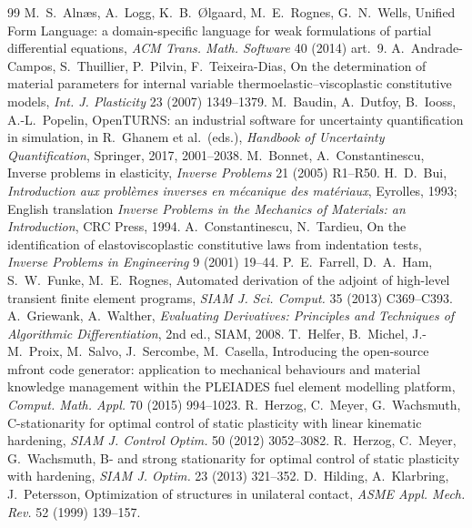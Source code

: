 \begin{chapterbib}{99}
 M.~S.~Aln\ae s, A.~Logg, K.~B.~{\O}lgaard, M.~E.~Rognes, G.~N.~Wells, Unified Form Language: a domain-specific language for weak formulations of partial differential equations, \emph{ACM Trans. Math. Software} 40 (2014) art.~9.
 A.~Andrade-Campos, S.~Thuillier, P.~Pilvin, F.~Teixeira-Dias, On the determination of material parameters for internal variable thermoelastic--viscoplastic constitutive models, \emph{Int. J. Plasticity} 23 (2007) 1349--1379.
 M.~Baudin, A.~Dutfoy, B.~Iooss, A.-L.~Popelin, OpenTURNS: an industrial software for uncertainty quantification in simulation, in R.~Ghanem et al.\ (eds.), \emph{Handbook of Uncertainty Quantification}, Springer, 2017, 2001--2038.
 M.~Bonnet, A.~Constantinescu, Inverse problems in elasticity, \emph{Inverse Problems} 21 (2005) R1--R50.
 H.~D.~Bui, \emph{Introduction aux probl\`emes inverses en m\'ecanique des mat\'eriaux}, Eyrolles, 1993; English translation \emph{Inverse Problems in the Mechanics of Materials: an Introduction}, CRC Press, 1994.
 A.~Constantinescu, N.~Tardieu, On the identification of elastoviscoplastic constitutive laws from indentation tests, \emph{Inverse Problems in Engineering} 9 (2001) 19--44.
 P.~E.~Farrell, D.~A.~Ham, S.~W.~Funke, M.~E.~Rognes, Automated derivation of the adjoint of high-level transient finite element programs, \emph{SIAM J. Sci. Comput.} 35 (2013) C369--C393.
 A.~Griewank, A.~Walther, \emph{Evaluating Derivatives: Principles and Techniques of Algorithmic Differentiation}, 2nd ed., SIAM, 2008.
 T.~Helfer, B.~Michel, J.-M.~Proix, M.~Salvo, J.~Sercombe, M.~Casella, Introducing the open-source mfront code generator: application to mechanical behaviours and material knowledge management within the PLEIADES fuel element modelling platform, \emph{Comput. Math. Appl.} 70 (2015) 994--1023.
 R.~Herzog, C.~Meyer, G.~Wachsmuth, C-stationarity for optimal control of static plasticity with linear kinematic hardening, \emph{SIAM J. Control Optim.} 50 (2012) 3052--3082.
 R.~Herzog, C.~Meyer, G.~Wachsmuth, B- and strong stationarity for optimal control of static plasticity with hardening, \emph{SIAM J. Optim.} 23 (2013) 321--352.
 D.~Hilding, A.~Klarbring, J.~Petersson, Optimization of structures in unilateral contact, \emph{ASME Appl. Mech. Rev.} 52 (1999) 139--157.

\end{chapterbib}
